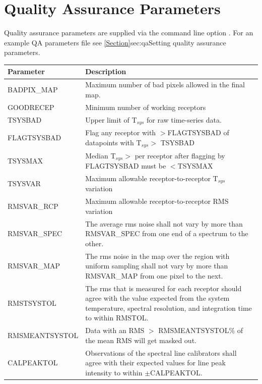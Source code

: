 \documentclass[11pt,oneside,chapters]{starlink}
\begin{document}
\chapter{Quality Assurance Parameters}
\label{app:qa}
Quality assurance parameters are supplied via the command line option
. For an example QA parameters file see
\cref{Section}{sec:qa}{Setting quality assurance parameters}.
\begin{table}[h!]
\begin{tabular}{|p{4.0cm}|p{11.0cm}|}
\hline
\textbf{Parameter} & \textbf{Description} \\
\hline
BADPIX\_MAP    & Maximum number of bad pixels allowed in the final map. \\
GOODRECEP      & Minimum number of working receptors \\
TSYSBAD        & Upper limit of T$_{sys}$ for raw time-series data.\\
FLAGTSYSBAD    & Flag any receptor with $>$FLAGTSYSBAD of datapoints with
                 T$_{sys}>$ TSYSBAD \\
TSYSMAX        & Median T$_{sys}>$ per receptor after flagging by FLAGTSYSBAD
                 must be $<$TSYSMAX \\
TSYSVAR        & Maximum allowable receptor-to-receptor  T$_{sys}$ variation \\
RMSVAR\_RCP    & Maximum allowable receptor-to-receptor RMS variation \\
RMSVAR\_SPEC   & The average rms noise shall not vary by more than RMSVAR\_SPEC
                 from one end of a spectrum to the other. \\
RMSVAR\_MAP    & The rms noise in the map over the region with uniform sampling
                 shall not vary by more than RMSVAR\_MAP from one pixel to the
                 next. \\
RMSTSYSTOL     & The rms that is measured for each receptor should agree with the
                 value expected from the system temperature, spectral resolution,
                 and integration time to within RMSTOL. \\
RMSMEANTSYSTOL & Data with an RMS $>$ RMSMEANTSYSTOL\% of the mean RMS will get
                 masked out. \\
CALPEAKTOL     & Observations of the spectral line calibrators shall agree with
                 their expected values for line peak intensity to within
                 $\pm$CALPEAKTOL.\\

\end{tabular}
\end{table}
\end{document}
